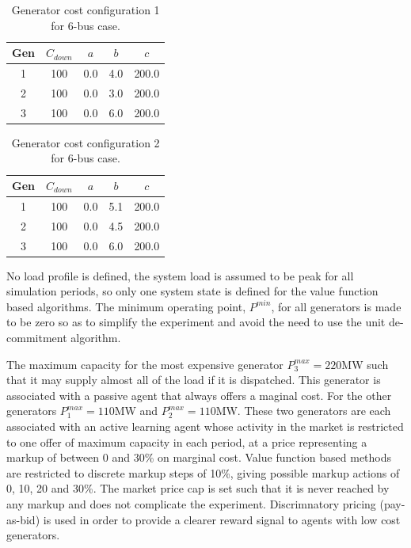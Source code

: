 %

\begin{table}
\begin{center}
\begin{tabular}{c|c|c|c|c}
\hline
Gen &$C_{down}$ &$a$ &$b$ &$c$ \\
\hline\hline
 1 &100 &0.0 &4.0 &200.0 \\
 2 &100 &0.0 &3.0 &200.0 \\
 3 &100 &0.0 &6.0 &200.0 \\
\hline
\end{tabular}
\caption{Generator cost configuration 1 for 6-bus case.}
\label{tbl:case6ww_gencost1}
\end{center}
\end{table}

\begin{table}
\begin{center}
\begin{tabular}{c|c|c|c|c}
\hline
Gen &$C_{down}$ &$a$ &$b$ &$c$ \\
\hline\hline
 1 &100 &0.0 &5.1 &200.0 \\
 2 &100 &0.0 &4.5 &200.0 \\
 3 &100 &0.0 &6.0 &200.0 \\
\hline
\end{tabular}
\caption{Generator cost configuration 2 for 6-bus case.}
\label{tbl:case6ww_gencost2}
\end{center}
\end{table}

No load profile is defined, the system load is assumed to be peak for all
simulation periods, so only one system state is defined for the value function
based algorithms.  The minimum operating point, $P^{min}$, for all generators
is made to be zero so as to simplify the experiment and avoid the need to
use the unit de-commitment algorithm.

The maximum capacity for the most expensive generator $P^{max}_3=220$MW such
that it may supply almost all of the load if it is dispatched.  This
generator is associated with a passive agent that always offers a maginal
cost.  For the other generators $P^{max}_1=110$MW and $P^{max}_2=110$MW.  These
two generators are each associated with an active learning agent whose activity
in the market is restricted to one offer of maximum capacity in each period,
at a price representing a markup of between 0 and 30\% on marginal cost.
Value function based methods are restricted to discrete markup steps of 10\%,
giving possible markup actions of 0, 10, 20 and 30\%. The market price cap is
set such that it is never reached by any markup and does not complicate the
experiment.  Discrimnatory pricing (pay-as-bid) is used in order to provide a
clearer reward signal to agents with low cost generators.

